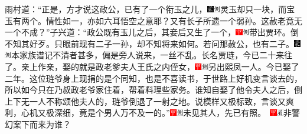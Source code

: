雨村道：``正是，方才说这政公，已有了一个衔玉之儿，{\includegraphics[width=3mm]{../Images/00006}\includegraphics[width=3mm]{../Images/00011}\footnotesize \kaishu 灵玉却只一块，而宝玉有两个。情性如一，亦如六耳悟空之意耶？}又有长子所遗一个弱孙。这赦老竟无一个不成？''子兴道：``政公既有玉儿之后，其妾后又生了一个，{\includegraphics[width=3mm]{../Images/00002}\includegraphics[width=3mm]{../Images/00011}\footnotesize \kaishu 带出贾环。}倒不知其好歹。只眼前现有二子一孙，却不知将来如何。若问那赦公，也有二子。{\includegraphics[width=3mm]{../Images/00006}\includegraphics[width=3mm]{../Images/00011}\footnotesize \kaishu 本家族谱记不清者甚多，偏是旁人说来，一丝不乱。}长名贾琏，今已二十来往了。亲上作亲，娶的就是政老爹夫人王氏之内侄女，{\includegraphics[width=3mm]{../Images/00002}\includegraphics[width=3mm]{../Images/00011}\footnotesize \kaishu 另出熙凤一人。}今已娶了二年。这位琏爷身上现捐的是个同知，也是不喜读书，于世路上好机变言谈去的，所以如今只在乃叔政老爷家住着，帮着料理些家务。谁知自娶了他令夫人之后，倒上下无一人不称颂他夫人的，琏爷倒退了一射之地。说模样又极标致，言谈又爽利，心机又极深细，竟是个男人万不及一的。''{\includegraphics[width=3mm]{../Images/00002}\includegraphics[width=3mm]{../Images/00011}\footnotesize \kaishu 未见其人，先已有照。　\includegraphics[width=3mm]{../Images/00002}\includegraphics[width=3mm]{../Images/00010}\footnotesize \kaishu 非警幻案下而来为谁？}

